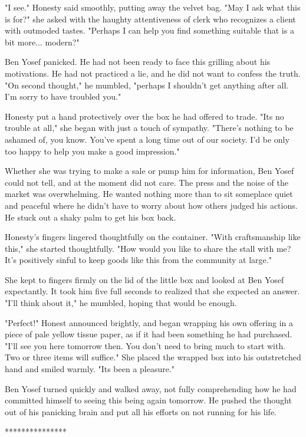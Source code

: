\documentclass{amsart}
\begin{document}
"I see." Honesty said smoothly, putting away the velvet bag. "May I ask what this is for?" she asked with the haughty attentiveness of clerk who recognizes a client with outmoded tastes. "Perhaps I can help you find something suitable that is a bit more... modern?"

Ben Yosef panicked. He had not been ready to face this grilling about his motivations. He had not practiced a lie, and he did not want to confess the truth. "On second thought," he mumbled, "perhaps I shouldn't get anything after all. I'm sorry to have troubled you." 

Honesty put a hand protectively over the box he had offered to trade. "Its no trouble at all," she began with just a touch of sympathy. "There's nothing to be ashamed of, you know. You've spent a long time out of our society. I'd be only too happy to help you make a good impression." 

Whether she was trying to make a sale or pump him for information, Ben Yosef could not tell, and at the moment did not care. The press and the noise of the market was overwhelming. He wanted nothing more than to sit someplace quiet and peaceful where he didn't have to worry about how others judged his actions. He stuck out a shaky palm to get his box back.

Honesty's fingers lingered thoughtfully on the container. "With craftsmanship like this," she started thoughtfully. "How would you like to share the stall with me? It's positively sinful to keep goods like this from the community at large."

She kept to fingers firmly on the lid of the little box and looked at Ben Yosef expectantly. It took him five full seconds to realized that she expected an answer. "I'll think about it," he mumbled, hoping that would be enough. 

"Perfect!" Honest announced brightly, and began wrapping his own offering in a piece of pale yellow tissue paper, as if it had been something he had purchased. "I'll see you here tomorrow then. You don't need to bring much to start with. Two or three items will suffice." She placed the wrapped box into his outstretched hand and smiled warmly. "Its been a pleasure."

Ben Yosef turned quickly and walked away, not fully comprehending how he had committed himself to seeing this being again tomorrow. He pushed the thought out of his panicking brain and put all his efforts on not running for his life.

\begin{center} *************** \end{center}
\end{document}

